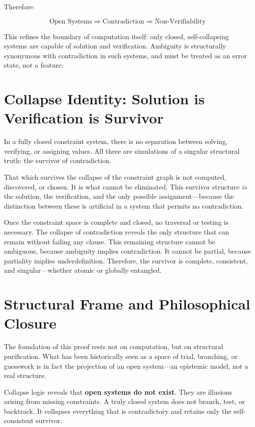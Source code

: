\documentclass[12pt]{article}
\begin{document}
Therefore:

\[
\text{Open Systems} \Rightarrow \text{Contradiction} \Rightarrow \text{Non-Verifiability}
\]

This refines the boundary of computation itself: only closed, self-collapsing systems are capable of solution and verification. Ambiguity is structurally synonymous with contradiction in such systems, and must be treated as an error state, not a feature.


\section{Collapse Identity: Solution is Verification is Survivor}

In a fully closed constraint system, there is no separation between solving, verifying, or assigning values. All three are simulations of a singular structural truth: the survivor of contradiction.

That which survives the collapse of the constraint graph is not computed, discovered, or chosen. It is what cannot be eliminated. This survivor structure \emph{is} the solution, the verification, and the only possible assignment—because the distinction between these is artificial in a system that permits no contradiction.

Once the constraint space is complete and closed, no traversal or testing is necessary. The collapse of contradiction reveals the only structure that can remain without failing any clause. This remaining structure cannot be ambiguous, because ambiguity implies contradiction. It cannot be partial, because partiality implies underdefinition. Therefore, the survivor is complete, consistent, and singular—whether atomic or globally entangled.



\section{Structural Frame and Philosophical Closure}

The foundation of this proof rests not on computation, but on structural purification. What has been historically seen as a space of trial, branching, or guesswork is in fact the projection of an open system—an epistemic model, not a real structure.

Collapse logic reveals that \textbf{open systems do not exist}. They are illusions arising from missing constraints. A truly closed system does not branch, test, or backtrack. It collapses everything that is contradictory and retains only the self-consistent survivor.
\end{document}
